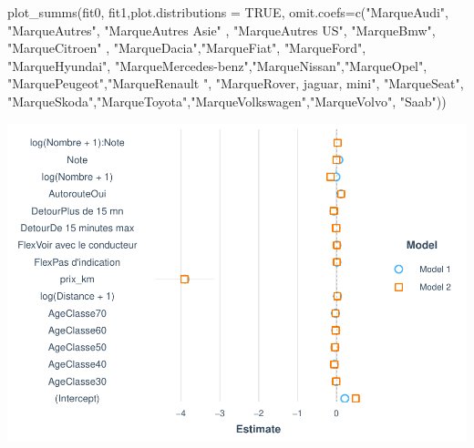 \documentclass[
]{book}
\newenvironment{Shaded}{\begin{snugshade}}{\end{snugshade}}
\newcommand{\AttributeTok}[1]{\textcolor[rgb]{0.77,0.63,0.00}{#1}}
\newcommand{\ConstantTok}[1]{\textcolor[rgb]{0.00,0.00,0.00}{#1}}
\newcommand{\FunctionTok}[1]{\textcolor[rgb]{0.00,0.00,0.00}{#1}}
\newcommand{\NormalTok}[1]{#1}
\newcommand{\StringTok}[1]{\textcolor[rgb]{0.31,0.60,0.02}{#1}}
\begin{document}
\begin{Shaded}
\begin{Highlighting}[]
\FunctionTok{plot\_summs}\NormalTok{(fit0, fit1,}\AttributeTok{plot.distributions =} \ConstantTok{TRUE}\NormalTok{,  }
           \AttributeTok{omit.coefs=}\FunctionTok{c}\NormalTok{(}\StringTok{"MarqueAudi"}\NormalTok{, }
                        \StringTok{"MarqueAutres"}\NormalTok{, }
                        \StringTok{"MarqueAutres Asie"}\NormalTok{ ,}
                        \StringTok{"MarqueAutres US"}\NormalTok{,}
                        \StringTok{"MarqueBmw"}\NormalTok{,                }
                        \StringTok{"MarqueCitroen"}\NormalTok{ , }\StringTok{"MarqueDacia"}\NormalTok{,}\StringTok{"MarqueFiat"}\NormalTok{,}
                        \StringTok{"MarqueFord"}\NormalTok{,}
                        \StringTok{"MarqueHyundai"}\NormalTok{,}
                        \StringTok{"MarqueMercedes{-}benz"}\NormalTok{,}\StringTok{"MarqueNissan"}\NormalTok{,}\StringTok{"MarqueOpel"}\NormalTok{,}
                        \StringTok{"MarquePeugeot"}\NormalTok{,}\StringTok{"MarqueRenault "}\NormalTok{,}
                        \StringTok{"MarqueRover, jaguar, mini"}\NormalTok{,}
                        \StringTok{"MarqueSeat"}\NormalTok{,}
                        \StringTok{"MarqueSkoda"}\NormalTok{,}\StringTok{"MarqueToyota"}\NormalTok{,}\StringTok{"MarqueVolkswagen"}\NormalTok{,}\StringTok{"MarqueVolvo"}\NormalTok{, }\StringTok{"Saab"}\NormalTok{))}
\end{Highlighting}
\end{Shaded}

\includegraphics{bookdown-demo_files/figure-latex/0910-1.pdf}
\end{document}
